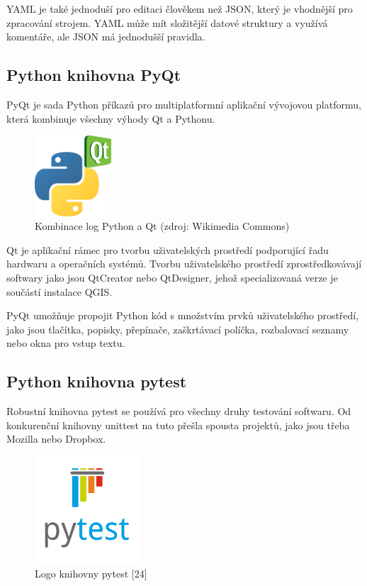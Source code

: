 \documentclass[a4paper,oneside,12pt]{book}
\begin{document}
\hspace{10mm}YAML je také jednoduší pro editaci člověkem než JSON, který je vhodnější pro zpracování strojem. YAML může mít složitější datové struktury a využívá komentáře, ale JSON má jednodušší pravidla. \cite{hsOq0virmVAO85Ud}


\subsection{Python knihovna PyQt} \label{pyqt}
\hspace{10mm}PyQt je sada Python příkazů pro multiplatformní aplikační vývojovou platformu, která kombinuje všechny výhody Qt a Pythonu.  \cite{Summerfield2007}

\begin{figure}[ht] \label{obr8}
\centering
\includegraphics[height=3cm]{pictures/Python_and_Qt.png}
\caption{Kombinace log Python a Qt  (zdroj: Wikimedia Commons)}
\label{fig:qt}
\end{figure}

\hspace{10mm}Qt je aplikační rámec pro tvorbu uživatelských prostředí podporující řadu hardwaru a operačních systémů. Tvorbu uživatelského prostředí zprostředkovávají softwary jako jsou QtCreator nebo QtDesigner, jehož specializovaná verze je součástí instalace QGIS.

\hspace{10mm}PyQt umožňuje propojit Python kód s množstvím prvků uživatelského prostředí, jako jsou tlačítka, popisky, přepínače, zaškrtávací políčka, rozbalovací seznamy nebo okna pro vstup textu.

\subsection{Python knihovna pytest} \label{pytest}
\hspace{10mm}Robustní knihovna pytest se používá pro všechny druhy testování softwaru. Od konkurenční knihovny unittest na tuto přešla spousta projektů, jako jsou třeba Mozilla nebo Dropbox. \cite{Okken2017}

\begin{figure}[ht] \label{obr9}
\centering
\includegraphics[height=4cm]{pictures/Pytest_logo.png}
\caption{Logo knihovny pytest [24]}
\label{fig:pytest}
\end{figure}
\end{document}
